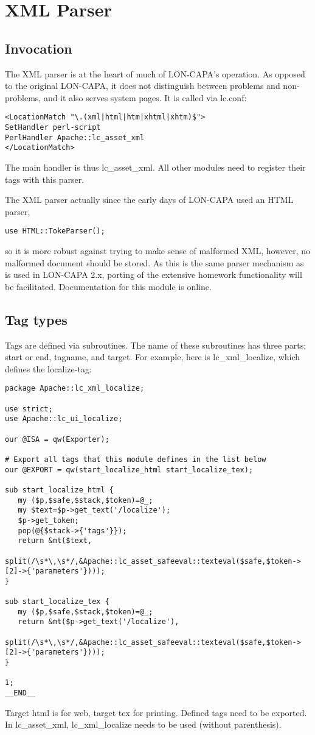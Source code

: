 \chapter{XML Parser}\label{xmlparser}
\section{Invocation}
The XML parser is at the heart of much of LON-CAPA's operation. As opposed to the original LON-CAPA, it does not distinguish between problems and non-problems, and it also serves system pages. It is called via lc.conf:
\begin{verbatim}
<LocationMatch "\.(xml|html|htm|xhtml|xhtm)$">
SetHandler perl-script
PerlHandler Apache::lc_asset_xml
</LocationMatch>
\end{verbatim}
The main handler is thus lc\_asset\_xml. All other modules need to register their tags with this parser.

The XML parser actually since the early days of LON-CAPA used an HTML parser,
\begin{verbatim}
use HTML::TokeParser();
\end{verbatim}
so it is more robust against trying to make sense of malformed XML, however, no malformed document should be stored. As this is the same parser mechanism as
is used in LON-CAPA 2.x, porting of the extensive homework functionality will be facilitated. Documentation for this module is online.
\section{Tag types}
Tags are defined via subroutines. The name of these subroutines has three parts: start or end, tagname, and target. For example, here is lc\_xml\_localize, which defines the localize-tag:
\begin{verbatim}
package Apache::lc_xml_localize;

use strict;
use Apache::lc_ui_localize;

our @ISA = qw(Exporter);

# Export all tags that this module defines in the list below
our @EXPORT = qw(start_localize_html start_localize_tex);

sub start_localize_html {
   my ($p,$safe,$stack,$token)=@_;
   my $text=$p->get_text('/localize');
   $p->get_token;
   pop(@{$stack->{'tags'}});
   return &mt($text,
              split(/\s*\,\s*/,&Apache::lc_asset_safeeval::texteval($safe,$token->[2]->{'parameters'})));
}

sub start_localize_tex {
   my ($p,$safe,$stack,$token)=@_;
   return &mt($p->get_text('/localize'),
              split(/\s*\,\s*/,&Apache::lc_asset_safeeval::texteval($safe,$token->[2]->{'parameters'})));
}

1;
__END__
\end{verbatim}
Target html is for web, target tex for printing. Defined tags need to be exported. In lc\_asset\_xml, lc\_xml\_localize needs to be used (without parenthesis).

